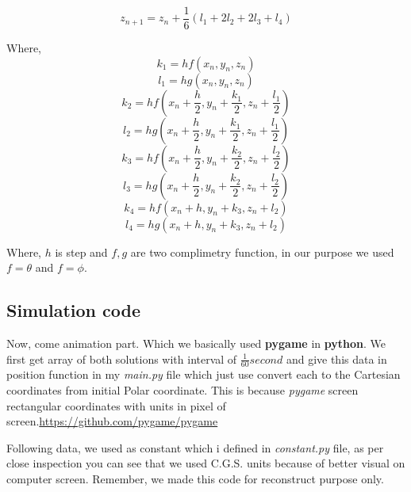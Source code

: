 \documentclass{article}
\begin{document}
\begin{equation*}
z_{n+1} = z_{n}+\frac{1}{6}(l_{1}+2l_{2}+2l_{3}+l_{4})
\end{equation*}

Where,
\begin{equation*}
k_{1}=hf(x_{n},y_{n},z_{n})
\end{equation*}
\begin{equation*}
l_{1}=hg(x_{n},y_{n},z_{n})
\end{equation*}
\begin{equation*}
k_{2}=hf(x_{n}+\frac{h}{2},y_{n}+\frac{k_{1}}{2},z_{n}+\frac{l_{1}}{2})
\end{equation*}
\begin{equation*}
l_{2}=hg(x_{n}+\frac{h}{2},y_{n}+\frac{k_{1}}{2},z_{n}+\frac{l_{1}}{2})
\end{equation*}
\begin{equation*}
k_{3}=hf(x_{n}+\frac{h}{2},y_{n}+\frac{k_{2}}{2},z_{n}+\frac{l_{2}}{2})
\end{equation*}
\begin{equation*}
l_{3}=hg(x_{n}+\frac{h}{2},y_{n}+\frac{k_{2}}{2},z_{n}+\frac{l_{2}}{2})
\end{equation*}
\begin{equation*}
k_{4}=hf(x_{n}+h,y_{n}+k_{3},z_{n}+l_{2})
\end{equation*}
\begin{equation*}
l_{4}=hg(x_{n}+h,y_{n}+k_{3},z_{n}+l_{2})
\end{equation*}

Where, \(h\) is step and \(f,g\) are two complimetry function, in our purpose we used \(f = \theta\) and \(f = \phi\).





\subsection{Simulation code}
\label{sec:org14579d6}

Now, come animation part. Which we basically used \textbf{pygame} in \textbf{python}. We first get array of both solutions with interval of \(\frac{1}{60} second\) and give this data in position function in my \emph{main.py} file which just use convert each to the Cartesian coordinates from initial Polar coordinate. This is because \emph{pygame} screen rectangular coordinates with units in pixel of screen.\url{https://github.com/pygame/pygame}

Following data, we used as constant which i defined in \emph{constant.py} file, as per close inspection you can see that we used C.G.S. units because of better visual on computer screen. Remember, we made this code for reconstruct purpose only.
\end{document}
